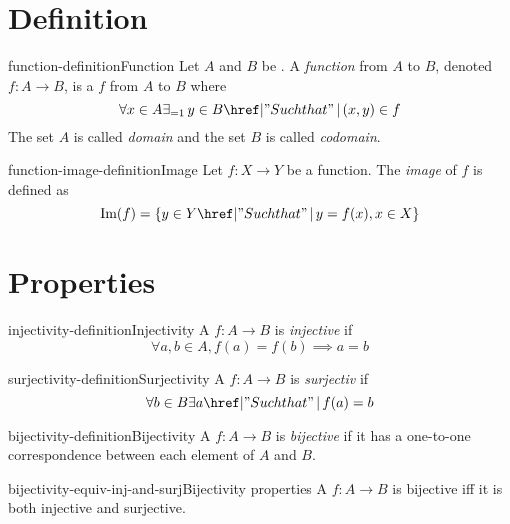 \documentclass[preview]{standalone}
\begin{document}
\genpage

\section{Definition}

\begin{snippetdefinition}{function-definition}{Function}
    Let \(A\) and \(B\) be \set[sets].
    A \textit{function} from \(A\) to \(B\), denoted \(f\colon A\to B\),
    is a \binrelation \(f\) from \(A\) to \(B\) where
    \[
        \forall x \in A \exists_{=1} \, y \in B \suchthat (x,y) \in f
    \]
    The set \(A\) is called \textit{domain} and the set \(B\) is called \textit{codomain}.
\end{snippetdefinition}

\begin{snippetdefinition}{function-image-definition}{Image}
    Let \(f\colon X\to Y\) be a function.
    The \textit{image} of \(f\) is defined as
    \[ \text{Im}(f) = \{y \in Y \suchthat y=f(x), x \in X \} \]
\end{snippetdefinition}

\section{Properties}

\begin{snippetdefinition}{injectivity-definition}{Injectivity}
    A \function \(f \colon A\to B\) is \textit{injective} if
    \[
        \forall a,b \in A, f(a) = f(b) \implies a = b
    \]
\end{snippetdefinition}

\begin{snippetdefinition}{surjectivity-definition}{Surjectivity}
    A \function \(f \colon A\to B\) is \textit{surjectiv} if
    \[
        \forall b \in B \exists a \suchthat f(a)=b
    \]
\end{snippetdefinition}

\begin{snippetdefinition}{bijectivity-definition}{Bijectivity}
    A \function \(f \colon A\to B\) is \textit{bijective} if
    it has a one-to-one correspondence between each element of \(A\) and  \(B\).
\end{snippetdefinition}

\begin{snippetcorollary}{bijectivity-equiv-inj-and-surj}{Bijectivity properties}
    A \function \(f \colon A\to B\) is bijective iff it is both injective and surjective.
\end{snippetcorollary}
\end{document}
